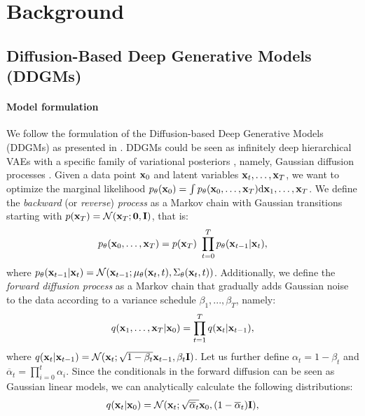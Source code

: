 
\section{Background}\label{sec:background}

\subsection{Diffusion-Based Deep Generative Models (DDGMs)}\label{sec:background_ddgm}


\paragraph{Model formulation}
We follow the formulation of the Diffusion-based Deep Generative Models (DDGMs) as presented in \citet{ho2020denoising,sohl2015deep}. DDGMs could be seen as infinitely deep hierarchical VAEs with a specific family of variational posteriors \cite{huang2021variational, kingma2021variational, tomczak2022deep, tzen2019neural}, namely, Gaussian diffusion processes \cite{sohl2015deep}. Given a data point ${\mathbf{x}}_0$ and latent variables ${\mathbf{x}}_{t}, \ldots, {\mathbf{x}}_{T}$, we want to optimize the marginal likelihood $p_{\theta}({\mathbf{x}}_0) = \int p_{\theta}({\mathbf{x}}_0, \ldots, {\mathbf{x}}_{T}) \mathrm{d} {\mathbf{x}}_1, \ldots, {\mathbf{x}}_{T}$. We define the \textit{backward} (or \textit{reverse}) \textit{process} as a Markov chain with Gaussian transitions starting with $p({\mathbf{x}}_T) = \mathcal{N}({\mathbf{x}}_{T}; \boldsymbol{0}, \mathbf{I})$, that is:
\begin{equation} \label{eq:backward_diffusion}
    p_{\theta}(\rvx_0, \ldots, \rvx_{T}) = p(\rvx_T)\ \prod_{t=0}^{T} p_{\theta}(\rvx_{t-1} | \rvx_{t}),
\end{equation}
where $p_{\theta}({\mathbf{x}}_{t-1} | {\mathbf{x}}_{t}) = \mathcal{N}({\mathbf{x}}_{t-1}; \mu_{\theta}({\mathbf{x}}_{t}, t), \Sigma_{\theta}({\mathbf{x}}_{t}, t))$.
Additionally, we define the \textit{forward diffusion process} as a Markov chain that gradually adds Gaussian noise to the data according to a variance schedule $\beta_1,...,\beta_T$, namely:
$$q({\mathbf{x}}_1, \ldots , {\mathbf{x}}_{T} | {\mathbf{x}}_{0}) = \prod_{t=1}^{T} q({\mathbf{x}}_t | {\mathbf{x}}_{t-1}),$$ 
where $q({\mathbf{x}}_t|{\mathbf{x}}_{t-1}) = \mathcal{N}({\mathbf{x}}_t; \sqrt{1 - \beta_t} {\mathbf{x}}_{t-1}, \beta_t \mathbf{I})$. 
Let us further define $\alpha_t = 1 - \beta_t$ and $\overline{\alpha}_t = \prod_{i=0}^{t} \alpha_{i}$. Since the conditionals in the forward diffusion can be seen as Gaussian linear models, we can analytically calculate the following distributions: 
\begin{equation}\label{eq:forward_diffusion_latent_from_data}
    q(\rvx_t|\rvx_0) = \mathcal{N}(\rvx_t; \sqrt{\overline{\alpha}_t} \rvx_0, (1 - \overline{\alpha}_t) \mathbf{I}),
\end{equation}
